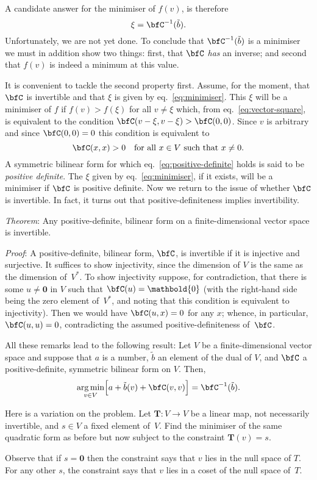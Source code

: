 \documentclass[10pt, a4paper]{article}
\newcommand{\bzero}{\mathbold{0}} %
\DeclareMathOperator*{\argmin}{arg\,min}
\begin{document}
A candidate answer for the minimiser of $f(v)$, is therefore
\begin{equation}
  \label{eq:minimiser}
  \xi = \bfC^{-1}(\tilde{b}).
\end{equation}
Unfortunately, we are not yet done. To conclude that
$\bfC^{-1}(\tilde{b})$ is a minimiser we must in addition show two
things: first, that $\bfC$ \emph{has} an inverse; and second that
$f(v)$ is indeed a minimum at this value.

It is convenient to tackle the second property first. Assume, for the
moment, that $\bfC$ is invertible and that $\xi$ is given by
eq.~\eqref{eq:minimiser}. This $\xi$ will be a minimiser of $f$ if
$f(v)>f(\xi)$ for all $v \neq \xi$ which, from eq.~\eqref{eq:vector-square},
is equivalent to the condition $\bfC(v-\xi,v-\xi)>\bfC(0,0)$. Since
$v$ is arbitrary and since $\bfC(0,0)=0$ this condition is equivalent
to
\begin{equation}
  \label{eq:positive-definite}
  \bfC(x,x) > 0 \quad\text{for all $x\in V$ such that $x\neq0$}.
\end{equation}
A symmetric bilinear form for which eq.~\eqref{eq:positive-definite}
holds is said to be \emph{positive definite}. The $\xi$ given by
eq.~\eqref{eq:minimiser}, if it exists, will be a minimiser if $\bfC$
is positive definite. Now we return to the issue of whether $\bfC$ is
invertible. In fact, it turns out that positive-definiteness implies
invertibility.

\emph{Theorem}: Any positive-definite, bilinear form on a
finite-dimensional vector space is invertible.

\emph{Proof}: A positive-definite, bilinear form, $\bfC$, is
invertible if it is injective and surjective. It suffices to show
injectivity, since the dimension of $V$ is the same as the dimension
of~$V^*$. To show injectivity suppose, for contradiction, that there
is some $u\neq\bzero$ in $V$ such that $\bfC(u)=\bzero$ (with the
right-hand side being the zero element of~$V^*$, and noting that this
condition is equivalent to injectivity). Then we would have
$\bfC(u, x) =0$ for any $x$; whence, in particular, $\bfC(u,u)=0$,
contradicting the assumed positive-definiteness of~$\bfC$.

All these remarks lead to the following result: Let $V$ be a
finite-dimensional vector space and suppose that $a$ is a number,
$\tilde{b}$ an element of the dual of $V$, and $\bfC$ a
positive-definite, symmetric bilinear form on $V$. Then,
\[
  \argmin_{v\in V} \Bigl[a +\tilde{b}(v) + \bfC(v,v) \Bigr] = \bfC^{-1}(\tilde{b}). 
\]

Here is a variation on the problem. Let $\bm{T}:V\to V$ be a linear map,
not necessarily invertible, and $s\in V$ a fixed element of~$V$. Find
the minimiser of the same quadratic form as before but now subject to
the constraint $\bm{T}(v)= s$.

Observe that if $s=\bzero$ then the constraint says that $v$ lies in
the null space of $T$. For any other $s$, the constraint says that $v$
lies in a coset of the null space of~$T$. 
\end{document}
